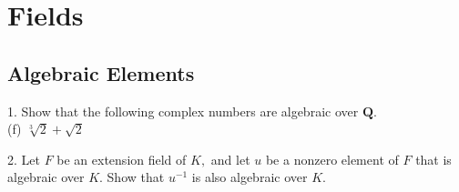 \section{Fields}
\subsection{Algebraic Elements}
\begin{mdframed}[style=darkQuesion]
  1. Show that the following complex numbers are algebraic over $\mathbf{Q}$.\\
  (f) $\sqrt[3]{2}+\sqrt{2}$
\end{mdframed}
\begin{mdframed}[style=darkAnswer,frametitle={Joe Starr}]
\end{mdframed}
\newpage
\begin{mdframed}[style=darkQuesion]
  2. Let $F$ be an extension field of $K,$ and let $u$ be a nonzero element of $F$ that is algebraic over $K .$ Show that $u^{-1}$ is also algebraic over $K$.
\end{mdframed}
\begin{mdframed}[style=darkAnswer,frametitle={Joe Starr}]
\end{mdframed}
\newpage

